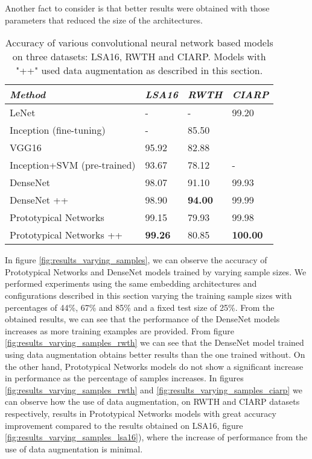 Another fact to consider is that better results were obtained with those parameters that reduced the size of the architectures.

\begin{table}[h!]
\centering
\begin{tabular}{ p{17em} p{6em} p{6em} p{6em}}
\toprule
\emph{Method} & \emph{LSA16} &  \emph{RWTH}  &  \emph{CIARP} \\ \midrule
LeNet \cite{ciarp2018} & - & - & 99.20  \\
Inception (fine-tuning) \cite{koller16} & - & 85.50 \\
VGG16 \cite{quiroga2017study} & 95.92 & 82.88 \\
Inception+SVM (pre-trained) \cite{quiroga2017study} &  93.67 & 78.12 & - \\
DenseNet  & 98.07 & 91.10 & 99.93 \\
DenseNet ++  & 98.90 & \textbf{94.00} & 99.99 \\
Prototypical Networks  & 99.15 & 79.93 & 99.98 \\
Prototypical Networks ++ & \textbf{99.26} & 80.85 & \textbf{100.00} \\
\bottomrule
\end{tabular}
\caption{Accuracy of various convolutional neural network based models on three datasets: LSA16, RWTH and CIARP. Models with "++" used data augmentation as described in this section. \label{tab:results}}
\end{table}

In figure \ref{fig:results_varying_samples}, we can observe the accuracy of Prototypical Networks and DenseNet models trained by varying sample sizes. We performed experiments using the same embedding architectures and configurations described in this section varying the training sample sizes with percentages of 44\%, 67\% and 85\% and a fixed test size of 25\%. From the obtained results, we can see that the performance of the DenseNet models increases as more training examples are provided. From figure \ref{fig:results_varying_samples_rwth} we can see that the DenseNet model trained using data augmentation obtains better results than the one trained without. On the other hand, Prototypical Networks models do not show a significant increase in performance as the percentage of samples increases. In figures \ref{fig:results_varying_samples_rwth} and \ref{fig:results_varying_samples_ciarp} we can observe how the use of data augmentation, on RWTH and CIARP datasets respectively, results in Prototypical Networks models with great accuracy improvement compared to the results obtained on LSA16, figure \ref{fig:results_varying_samples_lsa16}), where the increase of performance from the use of data augmentation is minimal.

